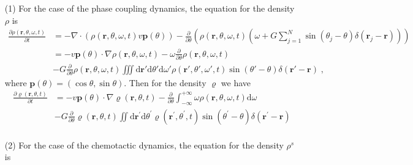 \documentclass{article}
\begin{document}
\begin{enumerate}
    \item[(1)] For the case of the phase coupling dynamics, the equation for the density $\rho$ is
    \begin{equation}
        \begin{aligned}
            \frac{\partial \rho \left( \mathbf{r},\theta ,\omega ,t \right)}{\partial t}&=-\nabla \cdot \left( \rho \left( \mathbf{r},\theta ,\omega ,t \right) v\mathbf{p}\left( \theta \right) \right) -\frac{\partial}{\partial \theta}\left( \rho \left( \mathbf{r},\theta ,\omega ,t \right) \left( \omega +G\sum_{j=1}^N{\sin \left( \theta _j-\theta \right) \delta \left( \mathbf{r}_j-\mathbf{r} \right)} \right) \right)\\
            &=-v\mathbf{p}\left( \theta \right) \cdot \nabla \rho \left( \mathbf{r},\theta ,\omega ,t \right) -\omega \frac{\partial}{\partial \theta}\rho \left( \mathbf{r},\theta ,\omega ,t \right) \\
            &-G\frac{\partial}{\partial \theta}\rho \left( \mathbf{r},\theta ,\omega ,t \right) \iiint{\text{d}\mathbf{r}'\text{d}\theta '\text{d}\omega '\rho \left( \mathbf{r}',\theta ',\omega ',t \right) \sin \left( \theta '-\theta \right) \delta \left( \mathbf{r}'-\mathbf{r} \right)}\;,
        \end{aligned}
    \end{equation}
    where $\mathbf{p}\left( \theta \right) =\left( \cos \theta ,\sin \theta \right)$. Then for the density $\varrho$ we have
    \begin{equation}
        \label{eq:coarseDensityAlign}
        \begin{aligned}
            \frac{\partial \varrho \left( \mathbf{r},\theta ,t \right)}{\partial t}&=-v\mathbf{p}\left( \theta \right) \cdot \nabla \varrho \left( \mathbf{r},\theta ,t \right) -\frac{\partial}{\partial \theta}\int_{-\infty}^{+\infty}{\omega \rho \left( \mathbf{r},\theta ,\omega ,t \right) \mathrm{d}\omega}\\
            &-G\frac{\partial}{\partial \theta}\varrho \left( \mathbf{r},\theta ,t \right) \iint{\mathrm{d}\mathbf{r}^{\prime}\mathrm{d}\theta^{\prime}\varrho \left( \mathbf{r}^{\prime},\theta^{\prime},t \right) \sin \left( \theta^{\prime}-\theta \right) \delta \left( \mathbf{r}^{\prime}-\mathbf{r} \right)}\\
        \end{aligned}
    \end{equation}
    \item[(2)] For the case of the chemotactic dynamics, the equation for the density $\rho^s$ is

\end{enumerate}
\end{document}
